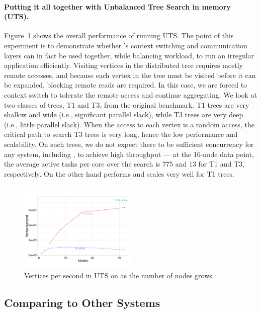 \paragraph{Putting it all together with Unbalanced Tree Search in memory
(UTS).} 
Figure~\ref{fig:grappa-uts} shows the overall performance of \Grappa running
UTS. The point of this experiment is to demonstrate whether \Grappa's context
switching and communication layers can in fact be used together, while
balancing workload, to run an irregular application efficiently. Visiting
vertices in the distributed tree requires mostly remote accesses, and because
each vertex in the tree must be visited before it can be expanded, blocking
remote reads are required. 
In this case, we are forced to context switch to tolerate the remote access and continue aggregating. 
We look at two classes of trees, T1 and T3, from
the original benchmark. T1 trees are very shallow and wide (i.e., significant
parallel slack), while T3 trees are very deep (i.e., little parallel slack).
When the access to each vertex is a random access, the critical path to search
T3 trees is very long, hence the low performance and scalability. On such
trees, we do not expect there to be sufficient concurrency for any system,
including \Grappa, to achieve high throughput --- at the 16-node data point,
the average active tasks per core over the search is 775 and 13 for T1 and T3,
respectively. On the other hand \Grappa performs and scales very well for T1
trees.


\begin{figure}[ht]
    \begin{center}
      \includegraphics[width=0.5\textwidth]{figs/uts_scale.pdf}
    \end{center}
    \caption{Vertices per second in UTS on \Grappa as the number of nodes grows.}
    \label{fig:grappa-uts}
\end{figure}

\subsection{Comparing \Grappa to Other Systems}
\label{eval:mainperf}

